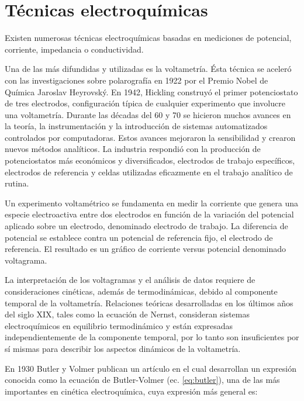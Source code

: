 \section{Técnicas electroquímicas}
					
		Existen numerosas técnicas electroquímicas basadas en mediciones de potencial, corriente, impedancia o conductividad.\cite{Wi2000,Bockris1974,koryta1993}

		Una de las más difundidas y utilizadas es la voltametría. Ésta técnica se aceleró con las investigaciones sobre polarografía en 1922 por el Premio Nobel de Química Jaroslav Heyrovský.\cite{Zuman1960} En 1942, Hickling construyó el primer potenciostato de tres electrodos, configuración típica de cualquier experimento que involucre una voltametría. \cite{hickling1942} Durante las décadas del 60 y 70 se hicieron muchos avances en la teoría, la instrumentación y la introducción de sistemas automatizados controlados por computadoras. Estos avances mejoraron la sensibilidad y crearon nuevos métodos analíticos. La industria respondió con la producción de potenciostatos más económicos y diversificados, electrodos de trabajo específicos, electrodos de referencia y celdas utilizadas eficazmente en el trabajo analítico de rutina.\cite{Wi2000}

		Un experimento voltamétrico se fundamenta en medir la corriente que genera una especie electroactiva entre dos electrodos en función de la variación del potencial aplicado sobre un electrodo, denominado electrodo de trabajo. La diferencia de potencial se establece contra un potencial de referencia fijo, el electrodo de referencia. El resultado es un gráfico de corriente versus potencial denominado voltagrama.

		La interpretación de los voltagramas y el análisis de datos requiere de consideraciones cinéticas, además de termodinámicas, debido al componente temporal de la voltametría. Relaciones teóricas desarrolladas en los últimos años del siglo XIX, tales como la ecuación de Nernst, consideran sistemas electroquímicos en equilibrio termodinámico y están expresadas independientemente de la componente temporal, por lo tanto son insuficientes por sí mismas para describir los aspectos dinámicos de la voltametría.\cite{nnnicholson1964}

		En 1930 Butler y Volmer publican un artículo en el cual desarrollan un expresión conocida como la ecuación de Butler-Volmer (ec. \ref{eq:butler}), una de las más importantes en cinética electroquímica, cuya expresión más general es\cite{Erdey-Gruz1930}: 

